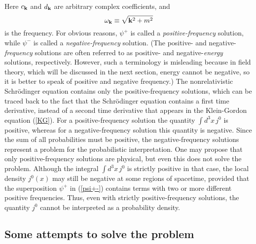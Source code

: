 \documentclass[12pt]{article}
\begin{document}
Here $c_{{\bf k}}$ and $d_{{\bf k}}$ are arbitrary complex coefficients,
and
\begin{equation}
\omega_{{\bf k}}\equiv\sqrt{{\bf k}^2+m^2} 
\end{equation}
is the frequency.
For obvious reasons, $\psi^+$ is called a {\em positive-frequency} solution, 
while $\psi^-$ is called a {\em negative-frequency} solution.
(The positive- and negative-{\em frequency} solutions are often referred to as 
positive- and negative-{\em energy} solutions, respectively. 
However, such a terminology is misleading because in field theory, 
which will be discussed in the next section, energy cannot be negative, 
so it is better to speak of positive and negative frequency.)
The nonrelativistic Schr\"odinger equation contains only 
the positive-frequency solutions, which can be traced back 
to the fact that the Schr\"odinger equation contains a first time 
derivative, instead of a second time derivative that appears 
in the Klein-Gordon equation (\ref{KG}).
For a positive-frequency solution the quantity $\int d^3x\, j^0$ is
positive, whereas for a negative-frequency solution this quantity 
is negative. Since the sum of all probabilities must be positive, 
the negative-frequency solutions represent a problem for the 
probabilistic interpretation. One may propose that only 
positive-frequency solutions are physical, but even this does not 
solve the problem. Although the integral $\int d^3x\, j^0$ is 
strictly positive in that case, the local density $j^0(x)$ may still be 
negative at some regions of spacetime, provided that the 
superposition $\psi^+$ in (\ref{psi+-}) contains 
terms with two or more different positive frequencies.
Thus, even with strictly positive-frequency solutions, the 
quantity $j^0$ cannot be interpreted as a probability density.  
 
\subsection{Some attempts to solve the problem}
\end{document}
